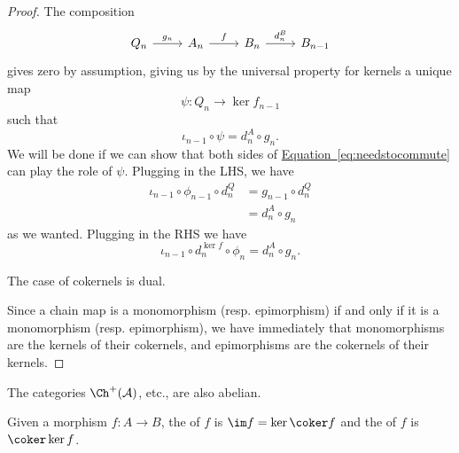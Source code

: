 \documentclass[main.tex]{subfiles}
\begin{document}
\begin{proof}
  The composition
  \begin{equation*}
    \begin{tikzcd}
      Q_{n}
      \arrow[r, "g_{n}"]
      & A_{n}
      \arrow[r, "f"]
      & B_{n}
      \arrow[r, "d_{n}^{B}"]
      & B_{n-1}
    \end{tikzcd}
  \end{equation*}
  gives zero by assumption, giving us by the universal property for kernels a unique map
  \begin{equation*}
    \psi\colon Q_{n} \to \ker f_{n-1}
  \end{equation*}
  such that
  \begin{equation*}
    \iota_{n-1} \circ \psi = d^{A}_{n} \circ g_{n}.
  \end{equation*}
  We will be done if we can show that both sides of \hyperref[eq:needstocommute]{Equation~\ref*{eq:needstocommute}} can play the role of $\psi$. Plugging in the LHS, we have
  \begin{align*}
    \iota_{n-1} \circ \phi_{n-1} \circ d^{Q}_{n} &= g_{n-1} \circ d^{Q}_{n} \\
    &= d^{A}_{n} \circ g_{n}
  \end{align*}
  as we wanted. Plugging in the RHS we have
  \begin{equation*}
    \iota_{n-1} \circ d^{\ker f}_{n} \circ \phi_{n} = d^{A}_{n} \circ g_{n}.
  \end{equation*}

  The case of cokernels is dual.

  Since a chain map is a monomorphism (resp. epimorphism) if and only if it is a monomorphism (resp. epimorphism), we have immediately that monomorphisms are the kernels of their cokernels, and epimorphisms are the cokernels of their kernels.
\end{proof}

The categories $\Ch^{+}(\mathcal{A})$, etc., are also abelian.

\begin{definition}
  \label{def:image_coimage}
  Given a morphism $f\colon A \to B$, the  of $f$ is $\im f = \ker\coker f$ and the  of $f$ is $\coker \ker f$. 
\end{definition}
\end{document}
